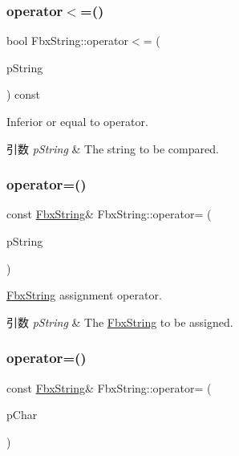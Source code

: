 \subsubsection{\texorpdfstring{operator$<$=()}{operator<=()}\hspace{0.1cm}{\footnotesize\ttfamily [2/2]}}
{\footnotesize\ttfamily bool Fbx\+String\+::operator$<$= (\begin{DoxyParamCaption}\item[{const char $\ast$}]{p\+String }\end{DoxyParamCaption}) const}

Inferior or equal to operator. 
\begin{DoxyParams}{引数}
{\em p\+String} & The string to be compared. \\
\hline
\end{DoxyParams}
\mbox{\label{class_fbx_string_a590eca2062f3423f5996652e92b3a6ed}} 
\subsubsection{\texorpdfstring{operator=()}{operator=()}\hspace{0.1cm}{\footnotesize\ttfamily [1/6]}}
{\footnotesize\ttfamily const \hyperlink{class_fbx_string}{Fbx\+String}\& Fbx\+String\+::operator= (\begin{DoxyParamCaption}\item[{const \hyperlink{class_fbx_string}{Fbx\+String} \&}]{p\+String }\end{DoxyParamCaption})}

\hyperlink{class_fbx_string}{Fbx\+String} assignment operator. 
\begin{DoxyParams}{引数}
{\em p\+String} & The \hyperlink{class_fbx_string}{Fbx\+String} to be assigned. \\
\hline
\end{DoxyParams}
\mbox{\label{class_fbx_string_a371eb6b599c8af2cbfa4ceb34c1cbf00}} 
\subsubsection{\texorpdfstring{operator=()}{operator=()}\hspace{0.1cm}{\footnotesize\ttfamily [2/6]}}
{\footnotesize\ttfamily const \hyperlink{class_fbx_string}{Fbx\+String}\& Fbx\+String\+::operator= (\begin{DoxyParamCaption}\item[{char}]{p\+Char }\end{DoxyParamCaption})}

